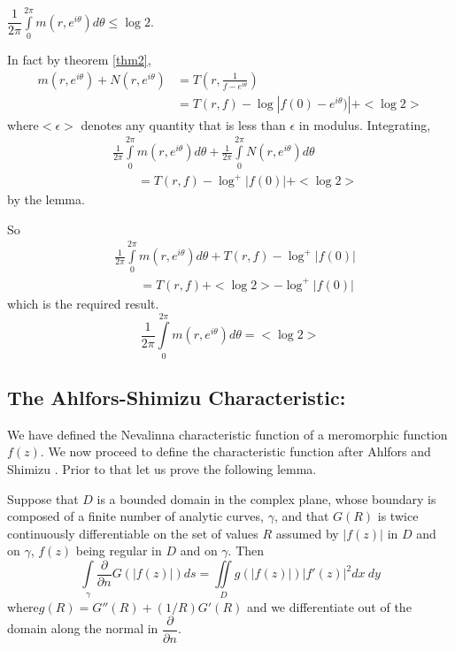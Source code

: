 \begin{cor}\label{part1-coro2}
$\dfrac{1}{2\pi}\int\limits^{2\pi}_{0}m(r,e^{i\theta})d\theta\leq \log
  2$.

In fact by theorem \ref{thm2},
\begin{align*}
m(r,e^{i\theta}) + N(r,e^{i\theta}) &=
T\left(r,\frac{1}{f-e^{i\theta}}\right)\\
&= T(r,f)-\log|f(0)-e^{i\theta})|+<\log  2>
\end{align*}
where\pageoriginale $<\epsilon>$ denotes any quantity that is less
than $\epsilon$ in modulus. \break Integrating,
\begin{align*}
& \frac{1}{2\pi}
\int\limits^{2\pi}_{0}m(r,e^{i\theta}) d\theta + \frac{1}{2\pi}
\int\limits^{2\pi}_{0} N(r,e^{i\theta})d\theta\\
&\qquad =T(r,f)-\log^{+}|f(0)|+<\log 2>
\end{align*}
by the lemma.

So
\begin{align*}
& \frac{1}{2\pi}\int\limits^{2\pi}_{0} m(r,e^{i\theta}) d\theta+T(r,f)
  - \log^{+}|f(0)|\\
&\qquad =T(r,f)+<\log 2>-\log^{+}|f(0)|
\end{align*}
which is the required result. \ie
$$
\frac{1}{2\pi}\int\limits^{2\pi}_{0}m(r,e^{i\theta})d\theta=<\log 2>
$$
\end{cor}

\subsection{The Ahlfors-Shimizu Characteristic:}

We have defined the Nevali\-nna characteristic function of a meromorphic
function $f(z)$. We now proceed to define the characteristic function
after Ahlfors \cite{1} and Shimi\-zu \cite{1}. Prior to that let us
prove the following lemma.

\begin{lem}[Spencer]\label{part1-lem2}
Suppose that $D$ is a bounded domain in the complex plane, whose
boundary is composed of a finite number of analytic curves, $\gamma$,
and that $G(R)$ is twice continuously differentiable on the set of
values $R$ assumed by $|f(z)|$ in $D$ and on $\gamma$, $f(z)$ being
regular in $D$ and on $\gamma$. Then
$$ 
\int\limits_{\gamma}\frac{\partial}{\partial n}
G(|f(z)|)ds=\iint\limits_{D}g(|f(z)|)|f'(z)|^{2}dx\ dy
$$
where\pageoriginale $g(R)=G''(R)+(1/R)G'(R)$ and we differentiate out
of the domain along the normal in $\dfrac{\partial}{\partial n}$.
\end{lem}

